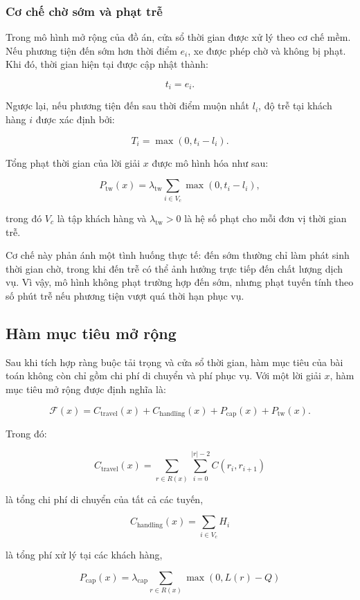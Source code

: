 \documentclass[12pt,a4paper]{article}
\numberwithin{figure}{subsection}
\begin{document}
\subsubsection{Cơ chế chờ sớm và phạt trễ}

Trong mô hình mở rộng của đồ án, cửa sổ thời gian được xử lý theo cơ chế mềm. Nếu phương tiện đến sớm hơn thời điểm $e_i$, xe được phép chờ và không bị phạt. Khi đó, thời gian hiện tại được cập nhật thành:

\[
t_i = e_i.
\]

Ngược lại, nếu phương tiện đến sau thời điểm muộn nhất $l_i$, độ trễ tại khách hàng $i$ được xác định bởi:

\[
T_i = \max(0, t_i - l_i).
\]

Tổng phạt thời gian của lời giải $x$ được mô hình hóa như sau:

\[
P_{\text{tw}}(x)
=
\lambda_{\text{tw}}
\sum_{i \in V_c}
\max(0, t_i - l_i),
\]

trong đó $V_c$ là tập khách hàng và $\lambda_{\text{tw}} > 0$ là hệ số phạt cho mỗi đơn vị thời gian trễ.

Cơ chế này phản ánh một tình huống thực tế: đến sớm thường chỉ làm phát sinh thời gian chờ, trong khi đến trễ có thể ảnh hưởng trực tiếp đến chất lượng dịch vụ. Vì vậy, mô hình không phạt trường hợp đến sớm, nhưng phạt tuyến tính theo số phút trễ nếu phương tiện vượt quá thời hạn phục vụ.

\subsection{Hàm mục tiêu mở rộng}

Sau khi tích hợp ràng buộc tải trọng và cửa sổ thời gian, hàm mục tiêu của bài toán không còn chỉ gồm chi phí di chuyển và phí phục vụ. Với một lời giải $x$, hàm mục tiêu mở rộng được định nghĩa là:

\[
\mathcal{F}(x)
=
C_{\text{travel}}(x)
+
C_{\text{handling}}(x)
+
P_{\text{cap}}(x)
+
P_{\text{tw}}(x).
\]

Trong đó:

\[
C_{\text{travel}}(x)
=
\sum_{r \in R(x)}
\sum_{i=0}^{|r|-2}
C(r_i, r_{i+1})
\]

là tổng chi phí di chuyển của tất cả các tuyến,

\[
C_{\text{handling}}(x)
=
\sum_{i \in V_c} H_i
\]

là tổng phí xử lý tại các khách hàng,

\[
P_{\text{cap}}(x)
=
\lambda_{\text{cap}}
\sum_{r \in R(x)}
\max(0, L(r) - Q)
\]
\end{document}
